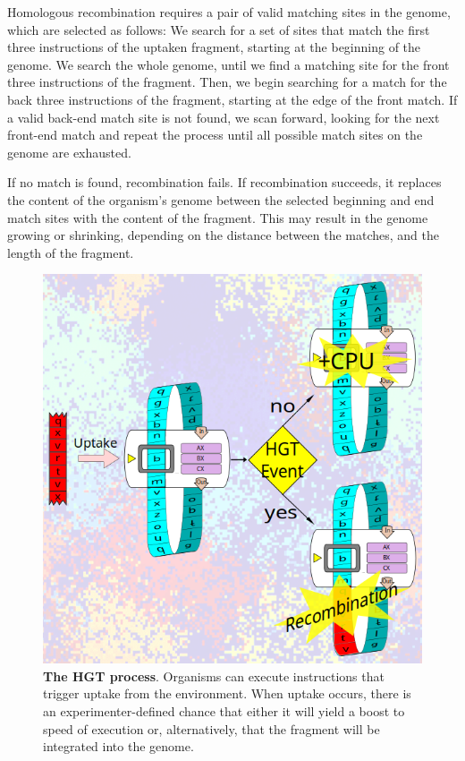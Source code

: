 \documentclass[PhD]{msu-thesis}
\begin{document}
Homologous recombination requires a pair of valid matching sites in the genome, which are selected as follows: We search for a set of sites that match the first three instructions of the uptaken fragment, starting at the beginning of the genome. We search the whole genome, until we find a matching site for the front three instructions of the fragment. Then, we begin searching for a match for the back three instructions of the fragment, starting at the edge of the front match. If a valid back-end match site is not found, we scan forward, looking for the next front-end match and repeat the process until all possible match sites on the genome are exhausted. 

If no match is found, recombination fails. If recombination succeeds, it replaces the content of the organism's genome between the selected beginning and end match sites with the content of the fragment. This may result in the genome growing or shrinking, depending on the distance between the matches, and the length of the fragment.

	\begin{figure}[h!]
	\begin{center}
	\includegraphics[width=0.7\columnwidth]{figures/HGT/hgt_figure.png}
	\caption{\textbf{The HGT process}. Organisms can execute instructions that trigger uptake from the environment. When uptake occurs, there is an experimenter-defined chance that either it will yield a boost to speed of execution or, alternatively, that the fragment will be integrated into the genome.
	}\label{fig:hgtprocess}
	\end{center}
	\end{figure}
\end{document}
